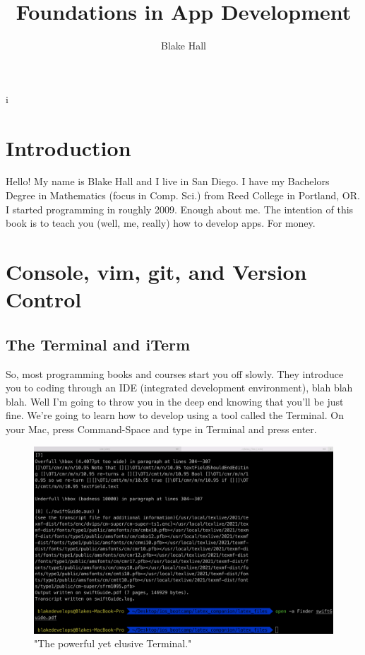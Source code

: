 \documentclass[12pt, letterpaper]{article}
\title{Foundations in App Development}
\author{Blake Hall}
\begin{document}
i
\pagecolor{myBackgroundColor} 
\color{myMainTextColor} 

\maketitle{}

\section{Introduction}

Hello! My name is Blake Hall and I live in San Diego. I have my Bachelors Degree in Mathematics (focus in Comp. Sci.)
from Reed College in Portland, OR. I started programming in roughly 2009. Enough about me. The intention of this book 
is to teach you (well, me, really) how to develop apps. For money.

\section{Console, vim, git, and Version Control}

\subsection{The Terminal and iTerm}

So, most programming books and courses start you off slowly. They introduce you to coding through an IDE (integrated
development environment), blah blah blah. Well I'm going to throw you in the deep end knowing that you'll be just fine.
We're going to learn how to develop using a tool called the Terminal. On your Mac, press Command-Space and type in 
Terminal and press enter. 

\begin{figure}[ht]
    \centering
        \includegraphics[scale=.12]{terminal_screenshot}
    \caption{"The powerful yet elusive Terminal."}
\end{figure}
\end{document}
